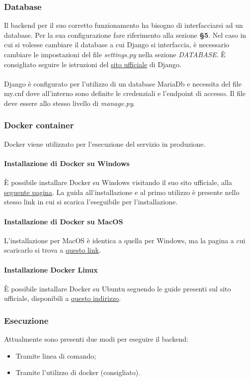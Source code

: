 \subsubsection{Database}
Il backend per il suo corretto funzionamento ha bisogno di interfacciarsi ad un database. Per la sua configurazione fare riferimento alla sezione \textbf{§5}.
Nel caso in cui si volesse cambiare il database a cui Django si interfaccia, è necessario cambiare le impostazioni del file \textit{settings.py} nella sezione \textit{DATABASE}. È consigliato seguire le istruzioni del \href{https://docs.djangoproject.com/en/3.2/ref/databases/}{sito ufficiale} di Django.
\\
\\
Django è configurato per l'utilizzo di un database MariaDb e necessita del file my.cnf dove all'interno sono definite le credenziali e l'endpoint di accesso. Il file deve essere allo stesso livello di \textit{manage.py}.

\subsubsection{Docker container}
Docker viene utilizzato per l'esecuzione del servizio in produzione.
\paragraph{Installazione di Docker su Windows}
È possibile installare Docker su Windows visitando il suo sito ufficiale, alla \href{https://hub.docker.com/editions/community/docker-ce-desktop-windows}{seguente pagina}. La guida all'installazione e al primo utilizzo è presente nello stesso link in cui si scarica l'eseguibile per l'installazione.
\paragraph{Installazione di Docker su MacOS}
L'installazione per MacOS è identica a quella per Windows, ma la pagina a cui scaricarlo si trova a \href{https://hub.docker.com/editions/community/docker-ce-desktop-mac}{questo link}.
\paragraph{Installazione Docker Linux}
È possibile installare Docker su Ubuntu seguendo le guide presenti sul sito ufficiale, disponibili a \href{https://docs.docker.com/engine/install/ubuntu/}{questo indirizzo}.

\subsubsection{Esecuzione}
Attualmente sono presenti due modi per eseguire il backend:
\begin{itemize}
	\item Tramite linea di comando;
	\item Tramite l'utilizzo di docker (consigliato).
\end{itemize}
